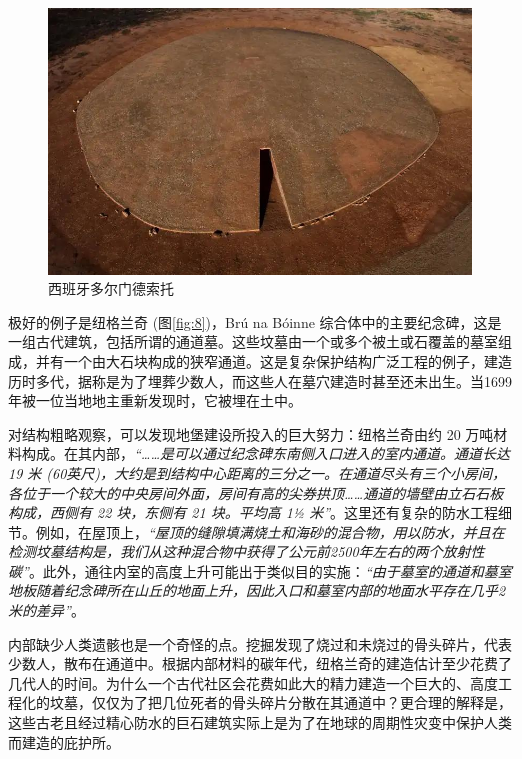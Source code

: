 \documentclass[10pt,twocolumn,letterpaper]{article}
\begin{document}
\begin{figure}[t]
\begin{center}
   \includegraphics[width=1\linewidth]{dolmen.jpg}
\end{center}
   \caption{西班牙多尔门德索托 \cite{53}}
\label{fig:9}
\label{fig:onecol}
\end{figure}

极好的例子是纽格兰奇 (图\ref{fig:8})，Brú na Bóinne 综合体中的主要纪念碑，这是一组古代建筑，包括所谓的通道墓。这些坟墓由一个或多个被土或石覆盖的墓室组成，并有一个由大石块构成的狭窄通道\cite{70}。这是复杂保护结构广泛工程的例子，建造历时多代，据称是为了埋葬少数人，而这些人在墓穴建造时甚至还未出生。当1699年被一位当地地主重新发现时，它被埋在土中。

对结构粗略观察，可以发现地堡建设所投入的巨大努力：纽格兰奇由约 20 万吨材料构成。在其内部，\textit{“……是可以通过纪念碑东南侧入口进入的室内通道。通道长达 19 米 (60英尺)，大约是到结构中心距离的三分之一。在通道尽头有三个小房间，各位于一个较大的中央房间外面，房间有高的尖券拱顶……通道的墙壁由立石石板构成，西侧有 22 块，东侧有 21 块。平均高 1½ 米”}\cite{70}。这里还有复杂的防水工程细节。例如，在屋顶上，\textit{“屋顶的缝隙填满烧土和海砂的混合物，用以防水，并且在检测坟墓结构是，我们从这种混合物中获得了公元前2500年左右的两个放射性碳”}\cite{71}。此外，通往内室的高度上升可能出于类似目的实施：\textit{“由于墓室的通道和墓室地板随着纪念碑所在山丘的地面上升，因此入口和墓室内部的地面水平存在几乎2米的差异”}\cite{71}。


内部缺少人类遗骸也是一个奇怪的点。挖掘发现了烧过和未烧过的骨头碎片，代表少数人，散布在通道中。根据内部材料的碳年代，纽格兰奇的建造估计至少花费了几代人的时间。为什么一个古代社区会花费如此大的精力建造一个巨大的、高度工程化的坟墓，仅仅为了把几位死者的骨头碎片分散在其通道中？更合理的解释是，这些古老且经过精心防水的巨石建筑实际上是为了在地球的周期性灾变中保护人类而建造的庇护所。
\end{document}
